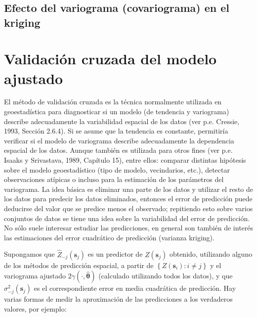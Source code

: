 \documentclass[
  spanish,
]{book}
\theoremstyle{break}
\theoremstyle{definition}
\theoremstyle{definition}
\theoremstyle{definition}
\theoremstyle{definition}
\theoremstyle{remark}
\begin{document}
\hypertarget{efecto-variog-kriging}{%
\subsection{Efecto del variograma (covariograma) en el kriging}\label{efecto-variog-kriging}}

\hypertarget{validacion-cruzada}{%
\section{Validación cruzada del modelo ajustado}\label{validacion-cruzada}}

El método de validación cruzada es la técnica normalmente utilizada en geoestadística para diagnosticar si un modelo (de tendencia y variograma) describe adecuadamente la variabilidad espacial de los datos (ver p.e. Cressie, 1993, Sección 2.6.4).
Si se asume que la tendencia es constante, permitiría verificar si el modelo de variograma describe adecuadamente la dependencia espacial de los datos.
Aunque también es utilizada para otros fines (ver p.e. Isaaks y Srivastava, 1989, Capítulo 15), entre ellos: comparar distintas hipótesis sobre el modelo geoestadístico (tipo de modelo, vecindarios, etc.), detectar observaciones atípicas o incluso para la estimación de los parámetros del variograma.
La idea básica es eliminar una parte de los datos y utilizar el resto de los datos para predecir los datos eliminados, entonces el error de predicción puede deducirse del valor que se predice menos el observado; repitiendo esto sobre varios conjuntos de datos se tiene una idea sobre la variabilidad del error de predicción.
No sólo suele interesar estudiar las predicciones, en general son también de interés las estimaciones del error cuadrático de predicción (varianza kriging).

Supongamos que \(\hat{Z}_{-j}(\mathbf{s}_{j})\) es un predictor de \(Z(\mathbf{s}_{j})\) obtenido, utilizando alguno de los métodos de predicción espacial, a partir de \(\left\{ Z(\mathbf{s}_{i}):i\neq j\right\}\) y el variograma ajustado \(2\gamma(\cdot ,\hat{\boldsymbol{\theta}})\) (calculado utilizando todos los datos), y que \(\sigma_{-j}^2 (\mathbf{s}_{j})\) es el correspondiente error en media cuadrática de predicción.
Hay varias formas de medir la aproximación de las predicciones a los verdaderos valores, por ejemplo:
\end{document}
